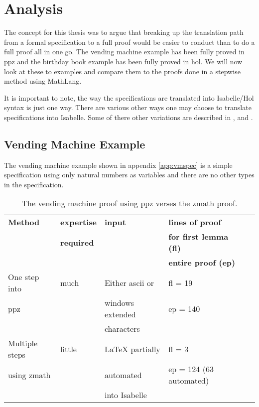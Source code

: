 \chapter{Analysis}
\label{ch:analysis}

The concept for this thesis was to argue that breaking up the translation path
from a formal specification to a full proof would be easier to conduct than to
do a full proof all in one go. The vending machine example has been fully proved
in \gls{ppz} and the birthday book example has been fully proved in \gls{hol}.
We will now look at these to examples and compare them to the proofs done in a
stepwise method using MathLang.

It is important to note, the way the specifications are translated into
Isabelle/Hol syntax is just one way. There are various other ways one may choose
to translate specifications into Isabelle. Some of there other variations are
described in \cite{Kolyang1996}, \cite{Kolyang86towardsa} and \cite{hol-z}.

\section{Vending Machine Example}

The vending machine example shown in appendix \ref{app:vmspec} is a simple
specification using only natural numbers as variables and there are no other
types in the specification. 

\begin{table}[H]
\begin{center}
\begin{tabular}{| l || l | l | l | l |}
\hline
\textbf{Method} & \textbf{expertise} &  \textbf{input} & \textbf{lines of proof}
\\
& \textbf{required} & & \textbf{for first lemma (fl)}  \\
& & & \textbf{entire proof (ep)} \\
\hline
One step into & much & Either ascii or & fl = 19  \\
\gls{ppz} & & windows extended & ep = 140 \\
& & characters & \\
\hline
Multiple steps & little & \LaTeX{} partially & fl = 3  \\
using \gls{zmath} & & automated & ep = 124 (63 automated) \\
& & into Isabelle & \\
\hline
\end{tabular}
\end{center}
\caption{The vending machine proof using \gls{ppz} verses the \gls{zmath} proof.}
\label{tab:comparevm}
\end{table}

